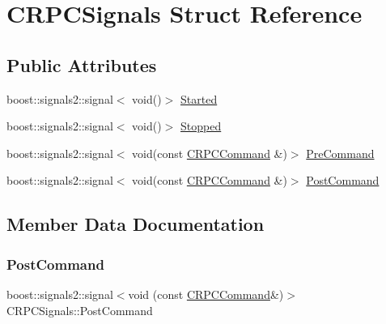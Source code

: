\hypertarget{struct_c_r_p_c_signals}{}\section{C\+R\+P\+C\+Signals Struct Reference}
\label{struct_c_r_p_c_signals}
\subsection*{Public Attributes}
\begin{DoxyCompactItemize}
\item 
boost\+::signals2\+::signal$<$ void()$>$ \mbox{\hyperlink{struct_c_r_p_c_signals_a201ab59320dae51002203903e66ec1a7}{Started}}
\item 
boost\+::signals2\+::signal$<$ void()$>$ \mbox{\hyperlink{struct_c_r_p_c_signals_a60800aedbc7b1e912cb4b432f3db7e99}{Stopped}}
\item 
boost\+::signals2\+::signal$<$ void(const \mbox{\hyperlink{class_c_r_p_c_command}{C\+R\+P\+C\+Command}} \&)$>$ \mbox{\hyperlink{struct_c_r_p_c_signals_a37e5ba485cf72626d09dd13de07a14a7}{Pre\+Command}}
\item 
boost\+::signals2\+::signal$<$ void(const \mbox{\hyperlink{class_c_r_p_c_command}{C\+R\+P\+C\+Command}} \&)$>$ \mbox{\hyperlink{struct_c_r_p_c_signals_a2b35d6a50a396f3fc0662192b5fb2a39}{Post\+Command}}
\end{DoxyCompactItemize}


\subsection{Member Data Documentation}
\mbox{\label{struct_c_r_p_c_signals_a2b35d6a50a396f3fc0662192b5fb2a39}} 
\subsubsection{\texorpdfstring{Post\+Command}{PostCommand}}
{\footnotesize\ttfamily boost\+::signals2\+::signal$<$void (const \mbox{\hyperlink{class_c_r_p_c_command}{C\+R\+P\+C\+Command}}\&)$>$ C\+R\+P\+C\+Signals\+::\+Post\+Command}

\mbox{\label{struct_c_r_p_c_signals_a37e5ba485cf72626d09dd13de07a14a7}} 
